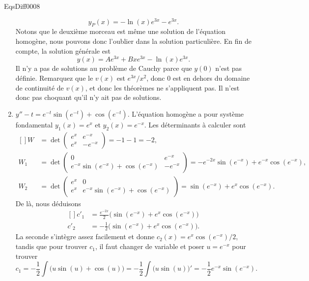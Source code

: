 \begin{corrige}{EqsDiff0008}
\begin{enumerate}
\begin{equation}
	y_P(x)=-\ln(x) e^{3x}- e^{3x}.
\end{equation}
Notons que le deuxième morceau est même une solution de l'équation homogène, nous pouvons donc l'oublier dans la solution particulière. En fin de compte, la solution générale est
\begin{equation}
	y(x)=A e^{3x}+Bx e^{3x}-\ln(x) e^{3x}.
\end{equation}
Il n'y a pas de solutions au problème de Cauchy parce que $y(0)$ n'est pas définie. Remarquez que le $v(x)$ est $ e^{3x}/x^2$, donc $0$ est en dehors du domaine de continuité de $v(x)$, et donc les théorèmes ne s'appliquent pas. Il n'est donc pas choquant qu'il n'y ait pas de solutions.

\item
$y''-t= e^{-t}\sin( e^{-t})+\cos( e^{-t})$. L'équation homogène a pour système fondamental $y_1(x)=e^x$ et $y_2(x)= e^{-x}$. Les déterminants à calculer sont
\begin{equation}
	\begin{aligned}[]
		W&=\det\begin{pmatrix}
	e^x	&	 e^{-x}	\\ 
	e^x	&	- e^{-x}	
\end{pmatrix}=-1-1=-2,\\
		W_1&=\det\begin{pmatrix}
	0	&	 e^{-x}	\\ 
	 e^{-x}\sin( e^{-x})+\cos( e^{-x})	&	- e^{-x}	
\end{pmatrix}=- e^{-2x}\sin( e^{-x})+ e^{-x}\cos( e^{-x}),\\
		W_2&=\det\begin{pmatrix}
	e^x	&	0	\\ 
	e^x	&	e^{-x}\sin( e^{-x})+\cos( e^{-x})	
\end{pmatrix}=\sin( e^{-x})+e^x\cos( e^{-x}).
	\end{aligned}
\end{equation}
De là, nous déduisons
\begin{equation}
	\begin{aligned}[]
		c'_1&=\frac{  e^{-2x} }{ 2 }\big( \sin( e^{-x})+ e^{x}\cos( e^{-x}) \big)\\
		c'_2&=-\frac{ 1 }{2}\big( \sin( e^{-x})+ e^{x}\cos( e^{-x}) \big).
	\end{aligned}
\end{equation}
La seconde s'intègre assez facilement et donne $c_2(x)=e^x\cos( e^{-x})/2$, tandis que pour trouver $c_1$, il faut changer de variable et poser $u= e^{-x}$ pour trouver
\begin{equation}
	c_1=-\frac{ 1 }{2}\int\big( u\sin(u)+\cos(u) \big)=-\frac{ 1 }{2}\int\big( u\sin(u) \big)'=-\frac{ 1 }{2} e^{-x}\sin( e^{-x}).
\end{equation}


\end{enumerate}
\end{corrige}

